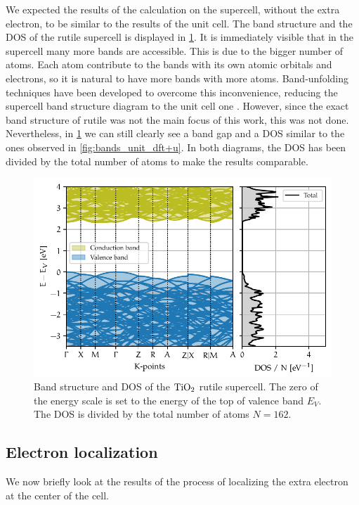 We expected the results of the calculation on the supercell, without the extra electron, to be similar to the results of the unit cell. The band structure and the DOS of the rutile supercell is displayed in \cref{fig:bands_super}. It is immediately visible that in the supercell many more bands are accessible. This is due to the bigger number of atoms. Each atom contribute to the bands with its own atomic orbitals and electrons, so it is natural to have more bands with more atoms. Band-unfolding techniques have been developed to overcome this inconvenience, reducing the supercell band structure diagram to the unit cell one \cite{mayo2020}. However, since the exact band structure of rutile was not the main focus of this work, this was not done. Nevertheless, in \cref{fig:bands_super} we can still clearly see a band gap and a DOS similar to the ones observed in \cref{fig:bands_unit_dft+u}. In both diagrams, the DOS has been divided by the total number of atoms to make the results comparable.

\begin{figure}
    \centering
    \includegraphics[width=\textwidth]{figures/super.pdf}
    \caption[Band structure and DOS of the $\ce{TiO_2}$ rutile supercell]{Band structure and DOS of the $\ce{TiO_2}$ rutile supercell. The zero of the energy scale is set to the energy of the top of valence band $E_V$. The DOS is divided by the total number of atoms $N = 162$.}
    \label{fig:bands_super}

\end{figure}

\subsection{Electron localization}
We now briefly look at the results of the process of localizing the extra electron at the center of the cell.

